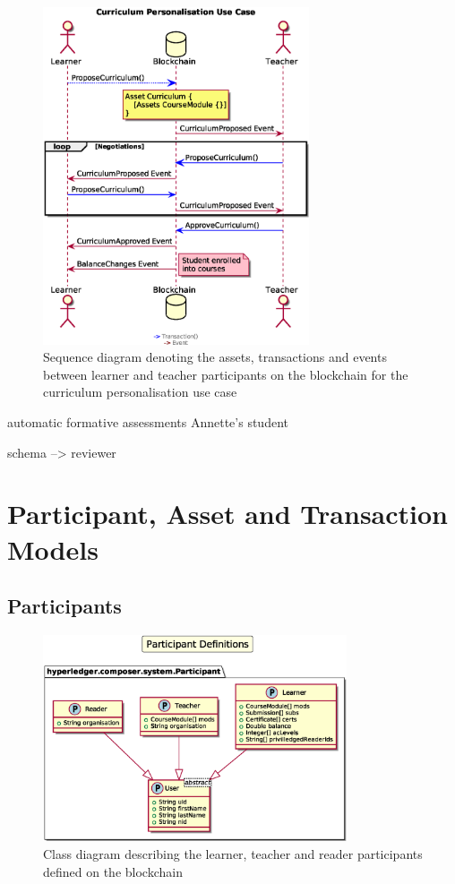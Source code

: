 \begin{figure}[!ht] 
    \centering    
    \includegraphics[width=0.7\textwidth]{personalisationloop}
    \caption[Curriculum Personalisation Use Case]
        {Sequence diagram denoting the assets, transactions and events between 
         learner and teacher participants on the blockchain for the curriculum personalisation use case} 
    \label{fig:personalisationloop}
\end{figure}

automatic formative assessments Annette's student

schema --> reviewer

\section{Participant, Asset and Transaction Models}

\subsection{Participants}
\begin{figure}[!ht] 
    \centering    
    \includegraphics[width=0.8\textwidth]{participants}
    \caption[Participants Class Diagram]
        {Class diagram describing the learner, teacher and reader participants defined on the blockchain} 
    \label{fig:participants}
\end{figure}


